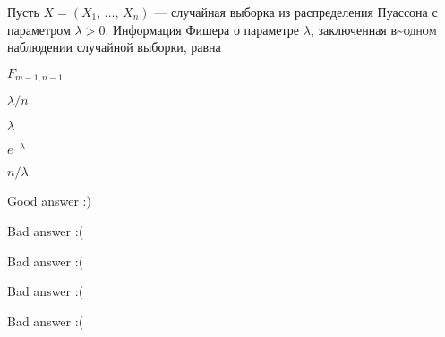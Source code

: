 
\begin{question}
Пусть \(X = (X_1, \, \ldots, \, X_n)\) — случайная выборка из
распределения Пуассона с параметром \(\lambda > 0\). Информация Фишера о
параметре \(\lambda\), заключенная в\textasciitilde{}\textsc{одном}
наблюдении случайной выборки, равна
\begin{answerlist}
  \item \(F_{m-1,n-1}\)
  \item \(\lambda / n\)
  \item \(\lambda\)
  \item \(e^{-\lambda}\)
  \item \(n / \lambda\)
\end{answerlist}
\end{question}

\begin{solution}
\begin{answerlist}
  \item Good answer :)
  \item Bad answer :(
  \item Bad answer :(
  \item Bad answer :(
  \item Bad answer :(
\end{answerlist}
\end{solution}

